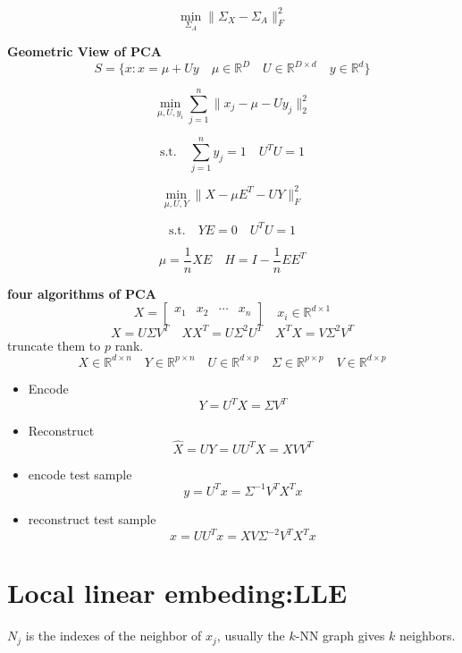 \documentclass[12pt,a4paper]{article}
\begin{document}
\[
	\min_{\Sigma_A} \| \Sigma_X - \Sigma_A\|_F^2
\]


\textbf{Geometric View of PCA}
\[
S = \{x: x = \mu + Uy \quad \mu \in \mathbb{R}^D \quad U \in \mathbb{R}^{D \times d} \quad y \in \mathbb{R}^d\}
\]

\[
	\min_{\mu,U,y_i} \sum_{j=1}^{n} \|x_j - \mu - Uy_j\|_2^2
\]

\[
	\mbox{s.t.} \quad \sum_{j=1}^{n} y_j = 1 \quad U^TU = 1
\]

\[
	\min_{\mu,U,Y} \|X - \mu E^T - UY\|_F^2
\]

\[
	\mbox{s.t.} \quad YE = 0 \quad U^TU = 1
\]


\[
	\mu = \frac{1}{n}XE \quad H = I -\frac{1}{n}EE^T
\]

\textbf{four algorithms of PCA}
\[
	X = \left[\begin{matrix}
	x_1 & x_2 & \cdots & x_n \\
	\end{matrix} \right]
	\quad x_i \in \mathbb{R}^{d\times 1}
\]
\[
	X = U\Sigma V^T \quad XX^T = U\Sigma^2U^T \quad X^TX = V\Sigma^2V^T
\]
\hspace{\parindent}truncate them to $p$ rank.
\[
	X \in \mathbb{R}^{d \times n} \quad
	Y \in \mathbb{R}^{p \times n} \quad 
	U \in \mathbb{R}^{d \times p} \quad 
	\Sigma \in \mathbb{R}^{p \times p} \quad
	V \in \mathbb{R}^{d \times p}
\]

\begin{itemize}
\item Encode
\[
	Y = U^TX = \Sigma V^T
\]

\item Reconstruct
\[
	\hat{X} = UY = UU^TX = XVV^T
\]

\item encode test sample
\[
	y = U^Tx = \Sigma^{-1}V^TX^T x
\]

\item reconstruct test sample
\[
	\hat{x} = UU^Tx = XV\Sigma^{-2}V^TX^Tx
\]


\end{itemize}







\section{Local linear embeding:LLE}

$N_j$ is the indexes of the neighbor of $x_j$, usually the $k$-NN graph gives $k$ neighbors.
\end{document}
